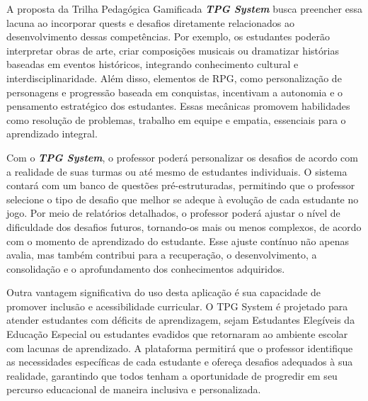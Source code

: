 A proposta da Trilha Pedagógica Gamificada \textit{\textbf{TPG System}} busca preencher essa lacuna ao incorporar quests e desafios diretamente relacionados ao desenvolvimento dessas competências. Por exemplo, os estudantes poderão interpretar obras de arte, criar composições musicais ou dramatizar histórias baseadas em eventos históricos, integrando conhecimento cultural e interdisciplinaridade. Além disso, elementos de RPG, como personalização de personagens e progressão baseada em conquistas, incentivam a autonomia e o pensamento estratégico dos estudantes. Essas mecânicas promovem habilidades como resolução de problemas, trabalho em equipe e empatia, essenciais para o aprendizado integral. 

Com o \textit{\textbf{TPG System}}, o professor poderá personalizar os desafios de acordo com a realidade de suas turmas ou até mesmo de estudantes individuais. O sistema contará com um banco de questões pré-estruturadas, permitindo que o professor selecione o tipo de desafio que melhor se adeque à evolução de cada estudante no jogo. Por meio de relatórios detalhados, o professor poderá ajustar o nível de dificuldade dos desafios futuros, tornando-os mais ou menos complexos, de acordo com o momento de aprendizado do estudante. Esse ajuste contínuo não apenas avalia, mas também contribui para a recuperação, o desenvolvimento, a consolidação e o aprofundamento dos conhecimentos adquiridos. 

Outra vantagem significativa do uso desta aplicação é sua capacidade de promover inclusão e acessibilidade curricular. O TPG System é projetado para atender estudantes com déficits de aprendizagem, sejam Estudantes Elegíveis da Educação Especial ou estudantes evadidos que retornaram ao ambiente escolar com lacunas de aprendizado. A plataforma permitirá que o professor identifique as necessidades específicas de cada estudante e ofereça desafios adequados à sua realidade, garantindo que todos tenham a oportunidade de progredir em seu percurso educacional de maneira inclusiva e personalizada. 